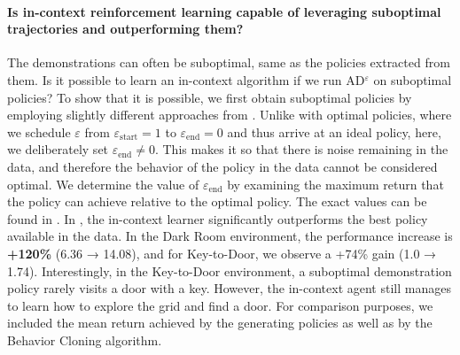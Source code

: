 \documentclass{article}
\theoremstyle{plain}
\theoremstyle{definition}
\theoremstyle{remark}
\begin{document}
\paragraph{Is in-context reinforcement learning capable of leveraging suboptimal trajectories and outperforming them?}
The demonstrations can often be suboptimal, same as the policies extracted from them. Is it possible to learn an in-context algorithm if we run AD$^\varepsilon$ on suboptimal policies? To show that it is possible, we first obtain suboptimal policies by employing slightly different approaches from . Unlike with optimal policies, where we schedule $\varepsilon$ from $\varepsilon_\textrm{start} = 1$ to $\varepsilon_\textrm{end} = 0$ and thus arrive at an ideal policy, here, we deliberately set $\varepsilon_\textrm{end} \neq 0$. This makes it so that there is noise remaining in the data, and therefore the behavior of the policy in the data cannot be considered optimal. We determine the value of $\varepsilon_\textrm{end}$ by examining the maximum return that the policy can achieve relative to the optimal policy. The exact values can be found in .
In , the in-context learner significantly outperforms the best policy available in the data. In the Dark Room environment, the performance increase is \textbf{+120\%} (6.36 → 14.08), and for Key-to-Door, we observe a +74\% gain (1.0 → 1.74). Interestingly, in the Key-to-Door environment, a suboptimal demonstration policy rarely visits a door with a key. However, the in-context agent still manages to learn how to explore the grid and find a door.
For comparison purposes, we included the mean return achieved by the generating policies as well as by the Behavior Cloning algorithm.
\end{document}

